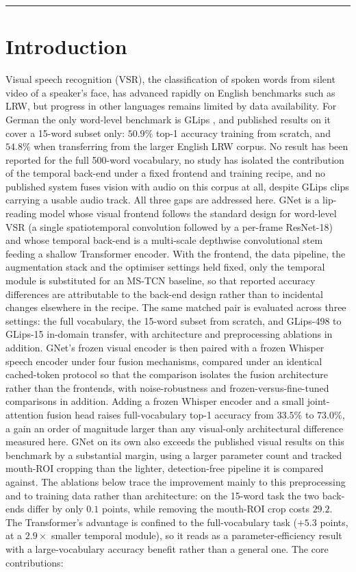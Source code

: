 \documentclass[10pt, a4paper]{article}
\begin{document}
\noindent\rule{\textwidth}{0.4pt}
\vspace{0.8em}
\section{Introduction}
\noindent Visual speech recognition (VSR), the classification of spoken words from silent video of a speaker's face, has advanced rapidly on English benchmarks such as LRW, but progress in other languages remains limited by data availability. For German the only word-level benchmark is GLips \citep{schwiebert2022glips}, and published results on it cover a 15-word subset only: $50.9\%$ top-1 accuracy training from scratch, and $54.8\%$ when transferring from the larger English LRW corpus. No result has been reported for the full 500-word vocabulary, no study has isolated the contribution of the temporal back-end under a fixed frontend and training recipe, and no published system fuses vision with audio on this corpus at all, despite GLips clips carrying a usable audio track.
\noindent All three gaps are addressed here. GNet is a lip-reading model whose visual frontend follows the standard design for word-level VSR (a single spatiotemporal convolution followed by a per-frame ResNet-18) and whose temporal back-end is a multi-scale depthwise convolutional stem feeding a shallow Transformer encoder. With the frontend, the data pipeline, the augmentation stack and the optimiser settings held fixed, only the temporal module is substituted for an MS-TCN baseline, so that reported accuracy differences are attributable to the back-end design rather than to incidental changes elsewhere in the recipe. The same matched pair is evaluated across three settings: the full vocabulary, the 15-word subset from scratch, and GLips-498 to GLips-15 in-domain transfer, with architecture and preprocessing ablations in addition. GNet's frozen visual encoder is then paired with a frozen Whisper speech encoder \citep{radford2022whisper} under four fusion mechanisms, compared under an identical cached-token protocol so that the comparison isolates the fusion architecture rather than the frontends, with noise-robustness and frozen-versus-fine-tuned comparisons in addition.
\noindent Adding a frozen Whisper encoder and a small joint-attention fusion head raises full-vocabulary top-1 accuracy from $33.5\%$ to $73.0\%$, a gain an order of magnitude larger than any visual-only architectural difference measured here. GNet on its own also exceeds the published visual results on this benchmark by a substantial margin, using a larger parameter count and tracked mouth-ROI cropping than the lighter, detection-free pipeline it is compared against. The ablations below trace the improvement mainly to this preprocessing and to training data rather than architecture: on the 15-word task the two back-ends differ by only $0.1$ points, while removing the mouth-ROI crop costs $29.2$. The Transformer's advantage is confined to the full-vocabulary task ($+5.3$ points, at a $2.9\times$ smaller temporal module), so it reads as a parameter-efficiency result with a large-vocabulary accuracy benefit rather than a general one. The core contributions:
\end{document}
